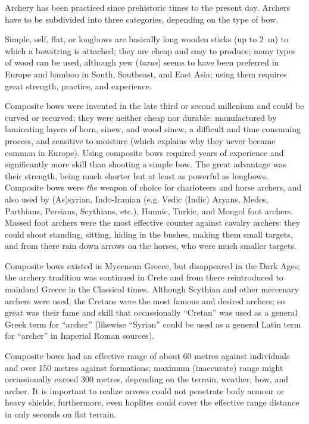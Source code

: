 \documentclass{article}
\begin{document}
Archery has been practiced since prehistoric times to the present day. Archers have to be subdivided into three categories, depending on the type of bow. 

Simple, self, flat, or longbows are basically long wooden sticks (up to 2~m) to which a bowstring is attached; they are cheap and easy to produce; many types of wood can be used, although yew (\textit{taxus}) seems to have been preferred in Europe and bamboo in South, Southeast, and East Asia; using them requires great strength, practice, and experience.

Composite bows were invented in the late third or second millenium and could be curved or recurved; they were neither cheap nor durable: manufactured by laminating layers of horn, sinew, and wood sinew, a difficult and time consuming process, and sensitive to moisture (which explains why they never became common in Europe). Using composite bows required years of experience and significantly more skill than shooting a simple bow. The great advantage was their strength, being much shorter but at least as powerful as longbows. Composite bows were \emph{the} weapon of choice for charioteers and horse archers, and also used by (As)syrian, Indo-Iranian (e.g. Vedic (Indic) Aryans, Medes, Parthians, Persians, Scythians, etc.), Hunnic, Turkic, and Mongol foot archers. Massed foot archers were the most effective counter against cavalry archers: they could shoot standing, sitting, hiding in the bushes, making them small targets, and from there rain down arrows on the horses, who were much smaller targets.

Composite bows existed in Mycenean Greece, but disappeared in the Dark Ages; the archery tradition was continued in Crete and from there reintroduced to mainland Greece in the Classical times. Although Scythian and other mercenary archers were used, the Cretans were the most famous and desired archers; so great was their fame and skill that occassionally ``Cretan'' was used as a general Greek term for ``archer'' (likewise ``Syrian'' could be used as a general Latin term for ``archer'' in Imperial Roman sources).

Composite bows had an effective range of about 60 metres against individuals and over 150 metres against formations; maximum (inaccurate) range might occassionally exceed 300 metres, depending on the terrain, weather, bow, and archer.
It is important to realize arrows could not penetrate body armour or heavy shields; furthermore, even hoplites could cover the effective range distance in only seconds on flat terrain. 
\end{document}
